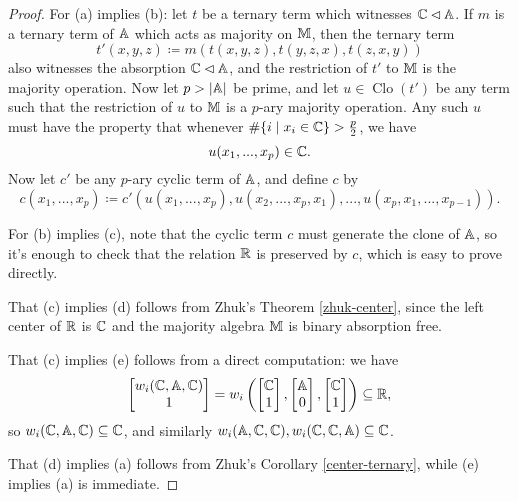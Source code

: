 \documentclass[letterpaper,11pt]{article}
\DeclareMathOperator{\Clo}{Clo}
\begin{document}
\begin{proof} For (a) implies (b): let $t$ be a ternary term which witnesses $\mathbb{C} \lhd \mathbb{A}$. If $m$ is a ternary term of $\mathbb{A}$ which acts as majority on $\mathbb{M}$, then the ternary term
\[
t'(x,y,z) \coloneqq m(t(x,y,z), t(y,z,x), t(z,x,y))
\]
also witnesses the absorption $\mathbb{C} \lhd \mathbb{A}$, and the restriction of $t'$ to $\mathbb{M}$ is the majority operation. Now let $p > |\mathbb{A}|$ be prime, and let $u \in \Clo(t')$ be any term such that the restriction of $u$ to $\mathbb{M}$ is a $p$-ary majority operation. Any such $u$ must have the property that whenever $\#\{i \mid x_i \in \mathbb{C}\} > \frac{p}{2}$, we have
\[
u(x_1, ..., x_p) \in \mathbb{C}.
\]
Now let $c'$ be any $p$-ary cyclic term of $\mathbb{A}$, and define $c$ by
\[
c(x_1, ..., x_p) \coloneqq c'(u(x_1, ..., x_p), u(x_2, ..., x_p, x_1), ..., u(x_p, x_1, ..., x_{p-1})).
\]

For (b) implies (c), note that the cyclic term $c$ must generate the clone of $\mathbb{A}$, so it's enough to check that the relation $\mathbb{R}$ is preserved by $c$, which is easy to prove directly.

That (c) implies (d) follows from Zhuk's Theorem \ref{zhuk-center}, since the left center of $\mathbb{R}$ is $\mathbb{C}$ and the majority algebra $\mathbb{M}$ is binary absorption free.

That (c) implies (e) follows from a direct computation: we have
\[
\begin{bmatrix}w_i(\mathbb{C},\mathbb{A},\mathbb{C})\\ 1\end{bmatrix} = w_i\left(\begin{bmatrix}\mathbb{C}\\ 1\end{bmatrix}, \begin{bmatrix}\mathbb{A}\\ 0\end{bmatrix}, \begin{bmatrix}\mathbb{C}\\ 1\end{bmatrix}\right) \subseteq \mathbb{R},
\]
so $w_i(\mathbb{C},\mathbb{A},\mathbb{C}) \subseteq \mathbb{C}$, and similarly $w_i(\mathbb{A},\mathbb{C},\mathbb{C}), w_i(\mathbb{C},\mathbb{C},\mathbb{A}) \subseteq \mathbb{C}$.

That (d) implies (a) follows from Zhuk's Corollary \ref{center-ternary}, while (e) implies (a) is immediate.
\end{proof}
\end{document}
